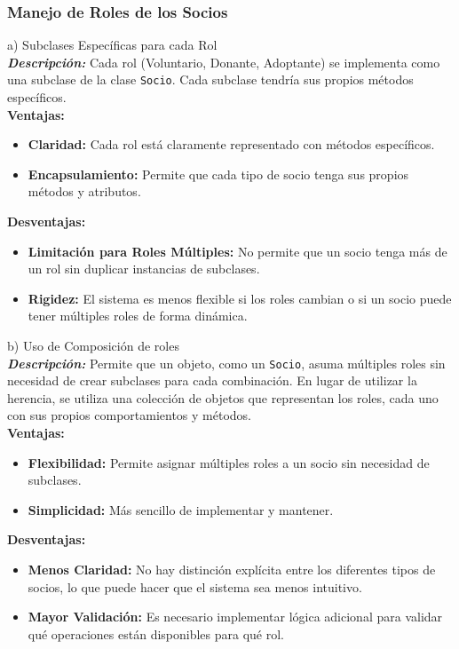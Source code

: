 \subsubsection{Manejo de Roles de los Socios}

\textbf{}{a) Subclases Específicas para cada Rol}\\

\textit{\textbf{Descripción:}}  
Cada rol (Voluntario, Donante, Adoptante) se implementa como una subclase de la clase \texttt{Socio}. Cada subclase tendría sus propios métodos específicos.\\

\textbf{Ventajas:}
\begin{itemize}
    \item \textbf{Claridad:} Cada rol está claramente representado con métodos específicos.
    \item \textbf{Encapsulamiento:} Permite que cada tipo de socio tenga sus propios métodos y atributos.
\end{itemize}

\textbf{Desventajas:}
\begin{itemize}
    \item \textbf{Limitación para Roles Múltiples:} No permite que un socio tenga más de un rol sin duplicar instancias de subclases.
    \item \textbf{Rigidez:} El sistema es menos flexible si los roles cambian o si un socio puede tener múltiples roles de forma dinámica.
\end{itemize}

\textbf{}{b) Uso de Composición de roles}\\

\textit{\textbf{Descripción:} } 
Permite que un objeto, como un \texttt{Socio}, asuma múltiples roles sin necesidad de crear subclases para cada combinación. En lugar de utilizar la herencia, se utiliza una colección de objetos que representan los roles, cada uno con sus propios comportamientos y métodos.\\

\textbf{Ventajas:}
\begin{itemize}
    \item \textbf{Flexibilidad:} Permite asignar múltiples roles a un socio sin necesidad de subclases.
    \item \textbf{Simplicidad:} Más sencillo de implementar y mantener.
\end{itemize}

\textbf{Desventajas:}
\begin{itemize}
    \item \textbf{Menos Claridad:} No hay distinción explícita entre los diferentes tipos de socios, lo que puede hacer que el sistema sea menos intuitivo.
    \item \textbf{Mayor Validación:} Es necesario implementar lógica adicional para validar qué operaciones están disponibles para qué rol.
\end{itemize}

